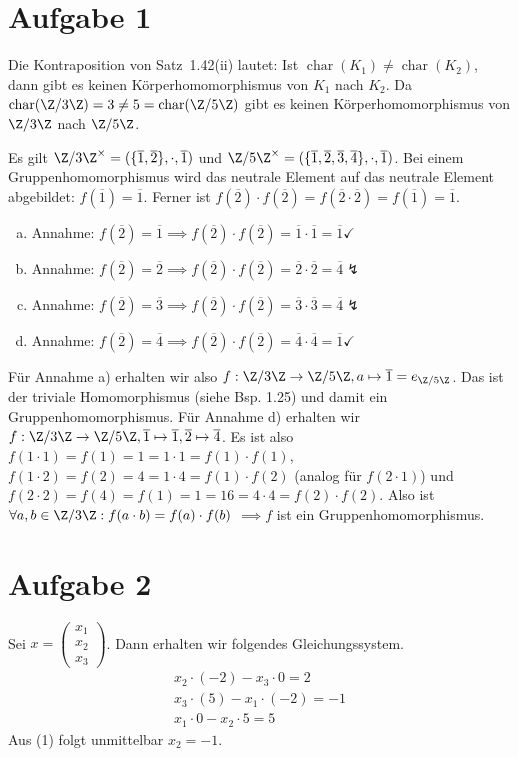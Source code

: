 \documentclass{article}
\begin{document}
	\section*{Aufgabe 1}
	Die Kontraposition von Satz~1.42(ii) lautet: Ist $\operatorname{char}(K_1) \neq  \operatorname{char}(K_2)$, dann gibt es keinen Körperhomomorphismus von $K_1$ nach $K_2$. Da $\operatorname{char}(\Z/3\Z) = 3 \neq 5 = \operatorname{char}(\Z/5\Z)$ gibt es keinen Körperhomomorphismus von $\Z/3\Z$ nach $\Z/5\Z$.
	
	Es gilt $\Z/3\Z^\times = (\{\overline{1},\overline{2}\}, \cdot, \overline{1})$ und $\Z/5\Z^\times = (\{\overline{1},\overline{2},\overline{3},\overline{4}\}, \cdot, \overline{1})$. Bei einem Gruppenhomomorphismus wird das neutrale Element auf das neutrale Element abgebildet: $f(\overline{1}) = \overline{1}$. Ferner ist $f(\overline{2}) \cdot f(\overline{2}) = f(\overline{2} \cdot \overline{2}) = f(\overline{1}) = \overline{1}$.\\
	\begin{enumerate}[a)]
		\item Annahme: $f(\overline{2}) = \overline{1} \implies f(\overline{2})\cdot f(\overline{2}) = \overline{1}\cdot \overline{1}= \overline{1}\checkmark$
		\item Annahme: $f(\overline{2}) = \overline{2} \implies f(\overline{2})\cdot f(\overline{2}) = \overline{2}\cdot \overline{2}= \overline{4}\lightning$
		\item Annahme: $f(\overline{2}) = \overline{3} \implies f(\overline{2})\cdot f(\overline{2}) = \overline{3}\cdot \overline{3}= \overline{4}\lightning$
		\item Annahme: $f(\overline{2}) = \overline{4} \implies f(\overline{2})\cdot f(\overline{2}) = \overline{4}\cdot \overline{4}= \overline{1}\checkmark$
	\end{enumerate}
	Für Annahme a) erhalten wir also $f: \Z/3\Z\to \Z/5\Z, a\mapsto \overline{1} = e_{\Z/5\Z}$. Das ist der triviale Homomorphismus (siehe Bsp. 1.25) und damit ein Gruppenhomomorphismus. Für Annahme d) erhalten wir  $f: \Z/3\Z\to \Z/5\Z, \overline{1} \mapsto \overline{1}, \overline{2} \mapsto \overline{4}$.
	Es ist also $f(1\cdot 1) = f(1) = 1 = 1\cdot 1 = f(1)\cdot f(1)$, $f(1\cdot 2) = f(2) = 4 = 1\cdot 4 = f(1)\cdot f(2)$ (analog für $f(2\cdot 1)$) und $f(2\cdot 2) = f(4)  = f(1) = 1 = 16 = 4\cdot 4 = f(2)\cdot f(2)$. Also ist $\forall a,b\in \Z/3\Z: f(a\cdot b) = f(a)\cdot f(b)$ $\implies f$ ist ein Gruppenhomomorphismus. 
	\section*{Aufgabe 2}
	Sei $x = \begin{pmatrix}
	x_1\\x_2\\x_3
	\end{pmatrix}$. Dann erhalten wir folgendes Gleichungssystem.
	\begin{align}
		x_2\cdot (-2) -x_3\cdot 0 = 2\\
		x_3\cdot (5) -x_1 \cdot (-2) = -1\\
		x_1\cdot 0 - x_2\cdot 5 = 5
	\end{align}
	Aus (1) folgt unmittelbar $x_2 = -1$.
\end{document}
